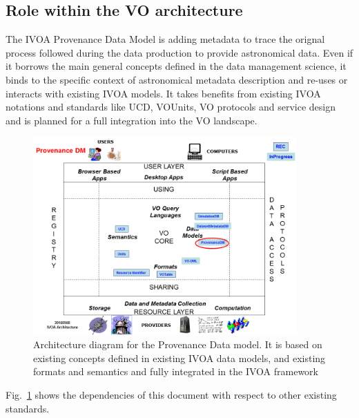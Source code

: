 \subsection{Role within the VO architecture}
 The IVOA Provenance Data Model is adding metadata to trace the orignal process followed during the data production to provide astronomical data. Even if it borrows the main general concepts defined in the data management science, it binds to the specific context of astronomical metadata description and re-uses or interacts with existing IVOA models.
It takes benefits from existing IVOA notations and standards like UCD, VOUnits, VO protocols and service design and is planned for a full integration into the VO landscape.


\begin{figure}
\centering
\includegraphics[width=0.9\textwidth]{VOArchitecture-Prov2016.png}
\caption{Architecture diagram for the Provenance Data model. It is based on existing concepts defined in existing IVOA data models, and existing formats and semantics and fully integrated in the IVOA framework}
\label{fig:archdiag}
\end{figure}

Fig.~\ref{fig:archdiag} shows the dependencies of this document with respect to other existing standards.
